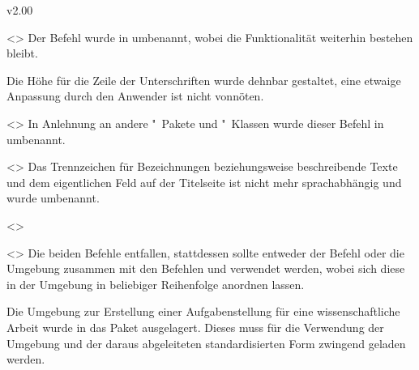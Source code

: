 \begin{Entity}{}
\begin{NoIndexDefault}
\begin{Cessations}{v2.00}
\begin{Cessation}
  {}
  <>
\printdeclarationlist
%
Der Befehl wurde in  umbenannt, wobei die Funktionalität 
weiterhin bestehen bleibt.
\end{Cessation}

\begin{Cessation}
  {}
\printdeclarationlist
%
Die Höhe für die Zeile der Unterschriften wurde dehnbar gestaltet, eine etwaige 
Anpassung durch den Anwender ist nicht vonnöten.
\end{Cessation}

\begin{Cessation}
  {}
  <>
\printdeclarationlist
%
In Anlehnung an andere "~Pakete und "~Klassen wurde 
dieser Befehl in  umbenannt.
\end{Cessation}

\begin{Cessation}
  {}
  <>
\printdeclarationlist
%
Das Trennzeichen für Bezeichnungen beziehungsweise beschreibende Texte und dem 
eigentlichen Feld auf der Titelseite ist nicht mehr sprachabhängig und wurde 
umbenannt.
\end{Cessation}

\begin{Cessation}
  {}
  <>
\begin{Cessation}
  {}
  <>
\printdeclarationlist
%
Die beiden Befehle entfallen, stattdessen sollte entweder der Befehl 
 oder die Umgebung  zusammen mit 
den Befehlen  und  verwendet werden, wobei 
sich diese in der Umgebung in beliebiger Reihenfolge anordnen lassen.
\end{Cessation}
\end{Cessation}


\minisec{\taskname}
%
\begin{Entity}{}
Die Umgebung zur Erstellung einer Aufgabenstellung für eine wissenschaftliche 
Arbeit wurde in das Paket  ausgelagert. Dieses muss 
für die Verwendung der Umgebung  und der daraus abgeleiteten 
standardisierten Form zwingend geladen werden.


\end{Entity}
\end{Cessations}
\end{NoIndexDefault}
\end{Entity}
